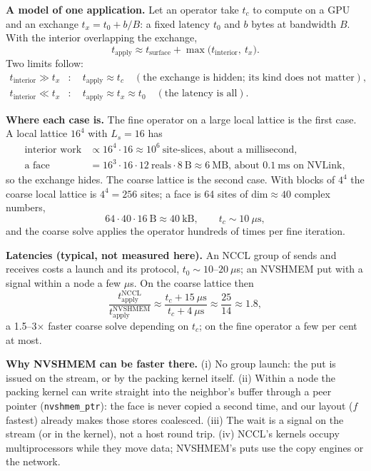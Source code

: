 \documentclass[11pt,a4paper]{article}
\numberwithin{equation}{section}
\newcommand{\code}[1]{\texttt{\small #1}}
\begin{document}
\textbf{A model of one application.} Let an operator take $t_c$ to compute on a GPU and an exchange
$t_x = t_0 + b/B$: a fixed latency $t_0$ and $b$ bytes at bandwidth $B$. With the interior
overlapping the exchange,
\begin{equation}
t_{\text{apply}} \approx t_{\text{surface}} + \max\big(t_{\text{interior}},\ t_x\big).
\end{equation}
Two limits follow:
\begin{align}
t_{\text{interior}} \gg t_x &:\quad t_{\text{apply}}\approx t_c\quad(\text{the exchange is hidden; its kind does not matter}),\\
t_{\text{interior}} \ll t_x &:\quad t_{\text{apply}}\approx t_x\approx t_0\quad(\text{the latency is all}).
\end{align}

\textbf{Where each case is.} The fine operator on a large local lattice is the first case. A local
lattice $16^4$ with $L_s=16$ has
\begin{align}
\text{interior work} &\propto 16^4\cdot16 \approx 10^6\ \text{site-slices, about a millisecond},\\
\text{a face} &= 16^3\cdot16\cdot12\ \text{reals}\cdot8\ \text{B}\approx 6\ \text{MB, about }0.1\ \text{ms on NVLink},
\end{align}
so the exchange hides. The coarse lattice is the second case. With blocks of $4^4$ the coarse local
lattice is $4^4=256$ sites; a face is 64 sites of $\text{dim}\approx 40$ complex numbers,
\begin{equation}
64\cdot40\cdot16\ \text{B}\approx 40\ \text{kB},\qquad t_c \sim 10\ \mu\text{s},
\end{equation}
and the coarse solve applies the operator hundreds of times per fine iteration.

\textbf{Latencies (typical, not measured here).} An NCCL group of sends and receives costs a launch
and its protocol, $t_0\sim10$--$20\ \mu$s; an NVSHMEM put with a signal within a node a few $\mu$s.
On the coarse lattice then
\begin{equation}
\frac{t_{\text{apply}}^{\text{NCCL}}}{t_{\text{apply}}^{\text{NVSHMEM}}} \approx \frac{t_c + 15\ \mu\text{s}}{t_c + 4\ \mu\text{s}} \approx \frac{25}{14} \approx 1.8 ,
\end{equation}
a 1.5--3$\times$ faster coarse solve depending on $t_c$; on the fine operator a few per cent at most.

\textbf{Why NVSHMEM can be faster there.} (i) No group launch: the put is issued on the stream, or
by the packing kernel itself. (ii) Within a node the packing kernel can write straight into the
neighbor's buffer through a peer pointer (\code{nvshmem\_ptr}): the face is never copied a second
time, and our layout ($f$ fastest) already makes those stores coalesced. (iii) The wait is a signal
on the stream (or in the kernel), not a host round trip. (iv) NCCL's kernels occupy multiprocessors
while they move data; NVSHMEM's puts use the copy engines or the network.
\end{document}
